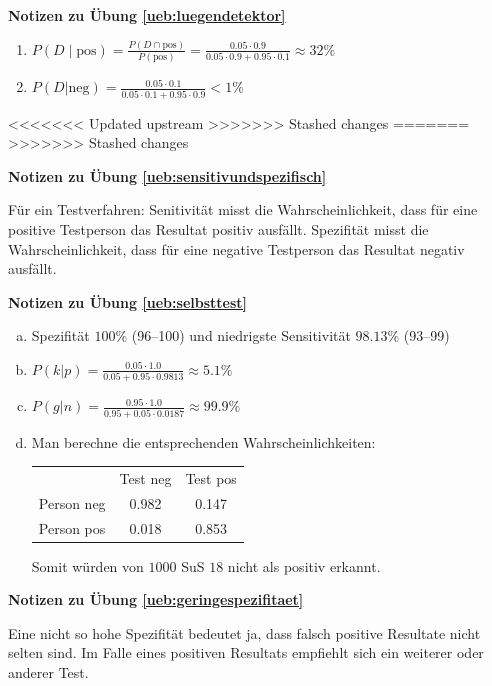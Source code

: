 \documentclass[%
<<<<<<< Updated upstream
<<<<<<< Updated upstream
11pt,%
twoside,%
titlepage,%
german,%
=======
=======
>>>>>>> Stashed changes
11pt,%
twoside,%
titlepage,%
swissgerman,%
<<<<<<< Updated upstream
>>>>>>> Stashed changes
=======
>>>>>>> Stashed changes
headsepline%
]{scrartcl}
\newcommand{\faReturnGray}{\textcolor{gray}{\faMailReply}} %
\newcommand{\spaltenheight}{\rule{0mm}{3ex}}
\newcommand{\spaltensep}{\\[1ex]}
\theoremstyle{definition}
\theoremstyle{plain}
\newcommand{\concatueb}[1]{ueb:#1}%
\newcommand{\concatlsg}[1]{lsg:#1}%
\newenvironment{lsg}[1]{%
    \par\noindent\textbf{Notizen zu Übung \ref{\concatueb{#1}}}\label{\concatlsg{#1}}
    \hfill\hyperref[\concatueb{#1}]{\faReturnGray}\par %
}{%
    \par%
}
\newcommand{\concatueb}[1]{ueb:#1}%
\newcommand{\concatlsg}[1]{lsg:#1}%
\newenvironment{lsg}[1]{%
    \par\noindent\textbf{Notizen zu Übung \ref{\concatueb{#1}}.}%
    \label{\concatlsg{#1}}
}{%
    \par%
}
\begin{document}
\begin{lsg}{luegendetektor}
    \begin{enumerate}
        \item $P(D\mid\text{pos})=\frac{P(D\cap\text{pos})}{P(\text{pos})}=\frac{0.05\cdot 0.9}{0.05\cdot0.9+0.95\cdot0.1}\approx32\%$
        \item $P(D|\text{neg})=\frac{0.05\cdot0.1}{0.05\cdot0.1+0.95\cdot0.9}<1\%$
    \end{enumerate}
\end{lsg}

<<<<<<< Updated upstream
>>>>>>> Stashed changes
=======
>>>>>>> Stashed changes
\begin{lsg}{sensitivundspezifisch}
    Für ein Testverfahren: Senitivität misst die Wahrscheinlichkeit, dass für eine positive Testperson das Resultat positiv ausfällt. Spezifität misst die Wahrscheinlichkeit, dass für eine negative Testperson das Resultat negativ ausfällt.
\end{lsg}
\begin{lsg}{selbsttest}
    \begin{enumerate}[a)]
        \item Spezifität $100\%$ (96--100) und niedrigste Sensitivität $98.13\%$ (93--99)
        \item $P(k|p)=\frac{0.05\cdot1.0}{0.05+0.95\cdot0.9813}\approx5.1\%$
        \item $P(g|n)=\frac{0.95\cdot1.0}{0.95+0.05\cdot0.0187}\approx99.9\%$
        \item Man berechne die entsprechenden Wahrscheinlichkeiten:\\
        
        \begin{table}[h]
\begin{center}
\begin{tabular}{|l|c|c|}
\hline
\rowcolor{Gray}\spaltenheight & Test neg & Test pos \spaltensep \hhline{|-|-|-|}
\rowcolor{lightyellow}\spaltenheight  Person neg & 0.982 & 0.147 \spaltensep \hhline{|-|-|-|}
\rowcolor{Gray}\spaltenheight  Person pos & 0.018 & 0.853 \spaltensep \hline
\end{tabular}
\end{center}
\end{table}
Somit würden von $1000$ SuS $18$ nicht als positiv erkannt.
    \end{enumerate}
\end{lsg}
\begin{lsg}{geringespezifitaet}
    Eine nicht so hohe Spezifität bedeutet ja, dass falsch positive Resultate nicht selten sind. Im Falle eines positiven Resultats empfiehlt sich ein weiterer oder anderer Test.
\end{lsg}
\end{document}
